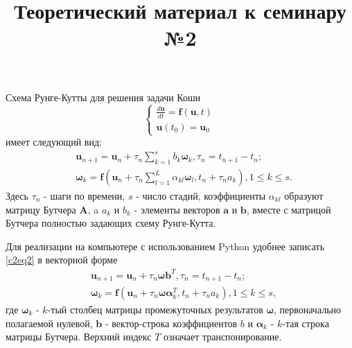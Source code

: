 \documentclass{article}
\title{Теоретический материал к семинару №2}
\date{}
\begin{document}
\maketitle

Схема Рунге-Кутты для решения задачи Коши
\begin{equation} \label{c2eq1}
	\begin{cases}
		\displaystyle \frac{d\mathbf{u}}{dt} = \mathbf{f} \left( \mathbf{u}, t \right) \\
		\mathbf{u}(t_0) = \mathbf{u}_0
	\end{cases}
\end{equation}
имеет следующий вид:
\begin{equation} \label{c2eq2}
	\begin{split}
		&\mathbf{u}_{n+1} = \mathbf{u}_n + \tau_n \sum_{k=1}^{s} b_k \boldsymbol{\omega}_k, \tau_n = t_{n+1} - t_n; \\
		&\boldsymbol{\omega}_k = \mathbf{f} \left( \mathbf{u}_n + \tau_n \sum_{l=1}^{L} \alpha_{kl} \boldsymbol{\omega}_l, t_n + \tau_n a_k \right), 1 \le k \le s.
	\end{split}
\end{equation}
Здесь $\tau_n$ - шаги по времени, $s$ - число стадий, коэффициенты $\alpha_{kl}$ образуют матрицу Бутчера $\mathbf{A}$, a $a_k$ и $b_k$ - элементы векторов $\mathbf{a}$ и $\mathbf{b}$, вместе с матрицой Бутчера полностью задающих схему Рунге-Кутта.

Для реализации на компьютере с использованием Python удобнее записать \eqref{c2eq2} в векторной форме
\begin{equation} \label{c2eq3}
	\begin{split}
		&\mathbf{u}_{n+1} = \mathbf{u}_n + \tau_n \boldsymbol{\omega} \mathbf{b}^T, \tau_n = t_{n+1} - t_n; \\
		&\boldsymbol{\omega}_k = \mathbf{f} \left( \mathbf{u}_n + \tau_n \boldsymbol{\omega} \boldsymbol{\alpha}^T_k, t_n + \tau_n a_k \right), 1 \le k \le s,
	\end{split} 
\end{equation}
где $\boldsymbol{\omega}_k$ - $k$-тый столбец матрицы промежуточных результатов $\boldsymbol{\omega}$, первоначально полагаемой нулевой, $\mathbf{b}$ - вектор-строка коэффициентов $b$ и $\boldsymbol{\alpha}_k$ - $k$-тая строка матрицы Бутчера. Верхний индекс $T$ означает транспонирование.
\end{document}
